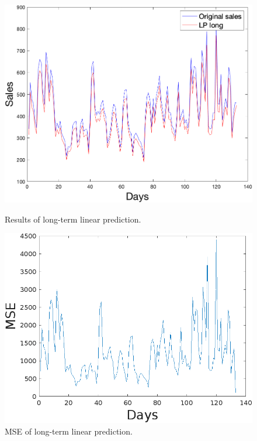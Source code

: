     \begin{figure}[h]
        \centering
        \begin{minipage}{0.45\textwidth}
            \centering
            \includegraphics[width=1\textwidth]{figures/expLTLP.png}
            \caption{Results of long-term linear prediction.}
            \label{fig:ltlp}
        \end{minipage}\hfill
        \begin{minipage}{0.45\textwidth}
            \centering
            \includegraphics[width=1\textwidth]{figures/expMseLTLP.png}
            \caption{MSE of long-term linear prediction.}
            \label{fig:ltlpmse}
        \end{minipage}
    \end{figure}
    

